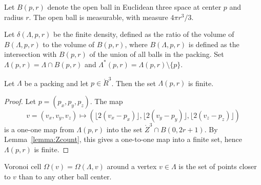 



  Let $B(p,r)$ denote the open ball in
Euclidean three space at center $p$ and radius $r$.  The open ball
is measurable, with measure $4\pi r^3/3$.



Let $\delta(\Lambda,p,r)$ be the finite density, defined as the
ratio of the volume of $B(\Lambda,p,r)$ to the volume of $B(p,r)$,
where $B(\Lambda,p,r)$ is defined as the intersection with
$B(p,r)$ of the union of all balls in the packing. Set
$\Lambda(p,r) = \Lambda \cap
B(p,r)$ and $\Lambda^*(p,r) = \Lambda(p,r)\setminus \{p\}$.

\begin{lemma}\label{lemma:Lambda-finite}
Let $\Lambda$ be a packing and let $p\in\ring{R}^3$.
Then the set $\Lambda(p,r)$ is finite.
\end{lemma}

\begin{proof}  Let $p = (p_x,p_y,p_z)$. The map
$$v=(v_x,v_y,v_z)\mapsto (\lfloor 2(v_x-p_x)
\rfloor, \lfloor 2(v_y-p_y) \rfloor, \lfloor 2(v_z-p_z) \rfloor)$$
is a one-one map from $\Lambda(p,r)$ into the set $\ring{Z}^3\cap B(0,2
r
 + 1)$.  By Lemma~\ref{lemma:Zcount}, this gives a one-to-one map
 into a finite set, hence $\Lambda(p,r)$ is finite.
\end{proof}


\begin{definition}\label{def:voronoi} Voronoi cell
$\Omega(v)=\Omega(\Lambda,v)$ around a
vertex $v\in \Lambda$ is the set of points closer to $v$ than to
any other ball center. 
\end{definition}

